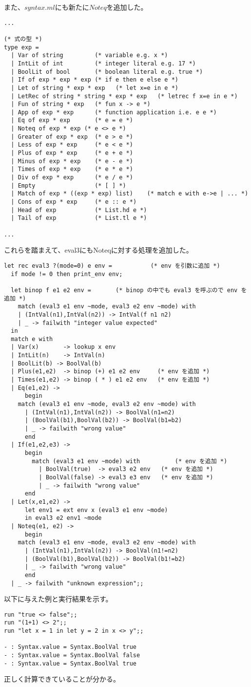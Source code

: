 \documentclass[a4paper,9pt]{jarticle}
\begin{document}
また、$syntax.ml$にも新たに$Noteq$を追加した。
\begin{lstlisting}
...

(* 式の型 *)
type exp = 
  | Var of string         (* variable e.g. x *)
  | IntLit of int         (* integer literal e.g. 17 *)
  | BoolLit of bool       (* boolean literal e.g. true *)
  | If of exp * exp * exp (* if e then e else e *)
  | Let of string * exp * exp   (* let x=e in e *)
  | LetRec of string * string * exp * exp   (* letrec f x=e in e *)
  | Fun of string * exp   (* fun x -> e *)
  | App of exp * exp      (* function application i.e. e e *)
  | Eq of exp * exp       (* e = e *)
  | Noteq of exp * exp (* e <> e *)
  | Greater of exp * exp  (* e > e *)
  | Less of exp * exp     (* e < e *)
  | Plus of exp * exp     (* e + e *)
  | Minus of exp * exp    (* e - e *)
  | Times of exp * exp    (* e * e *)
  | Div of exp * exp      (* e / e *)
  | Empty                 (* [ ] *)
  | Match of exp * ((exp * exp) list)    (* match e with e->e | ... *)
  | Cons of exp * exp     (* e :: e *)
  | Head of exp           (* List.hd e *)
  | Tail of exp           (* List.tl e *)

...
\end{lstlisting}

これらを踏まえて、eval3にもNoteqに対する処理を追加した。

\begin{lstlisting}
let rec eval3 ?(mode=0) e env =           (* env を引数に追加 *)
  if mode != 0 then print_env env;

  let binop f e1 e2 env =       (* binop の中でも eval3 を呼ぶので env を追加 *)
    match (eval3 e1 env ~mode, eval3 e2 env ~mode) with
    | (IntVal(n1),IntVal(n2)) -> IntVal(f n1 n2)
    | _ -> failwith "integer value expected"
  in 
  match e with
  | Var(x)       -> lookup x env
  | IntLit(n)    -> IntVal(n)
  | BoolLit(b) -> BoolVal(b)
  | Plus(e1,e2)  -> binop (+) e1 e2 env     (* env を追加 *)
  | Times(e1,e2) -> binop ( * ) e1 e2 env   (* env を追加 *)
  | Eq(e1,e2) ->
      begin
	match (eval3 e1 env ~mode, eval3 e2 env ~mode) with
	  | (IntVal(n1),IntVal(n2)) -> BoolVal(n1=n2)
	  | (BoolVal(b1),BoolVal(b2)) -> BoolVal(b1=b2)
	  | _ -> failwith "wrong value"
      end
  | If(e1,e2,e3) ->
      begin
        match (eval3 e1 env ~mode) with          (* env を追加 *)
          | BoolVal(true)  -> eval3 e2 env   (* env を追加 *)
          | BoolVal(false) -> eval3 e3 env   (* env を追加 *)
          | _ -> failwith "wrong value"
      end
  | Let(x,e1,e2) -> 
      let env1 = ext env x (eval3 e1 env ~mode)
      in eval3 e2 env1 ~mode
  | Noteq(e1, e2) ->
      begin
	match (eval3 e1 env ~mode, eval3 e2 env ~mode) with
	  | (IntVal(n1),IntVal(n2)) -> BoolVal(n1!=n2)
	  | (BoolVal(b1),BoolVal(b2)) -> BoolVal(b1!=b2)
	  | _ -> failwith "wrong value"
      end
  | _ -> failwith "unknown expression";;
\end{lstlisting}

以下に与えた例と実行結果を示す。

\begin{lstlisting}
run "true <> false";;
run "(1+1) <> 2";;
run "let x = 1 in let y = 2 in x <> y";;

- : Syntax.value = Syntax.BoolVal true
- : Syntax.value = Syntax.BoolVal false
- : Syntax.value = Syntax.BoolVal true
\end{lstlisting}

正しく計算できていることが分かる。
\end{document}
